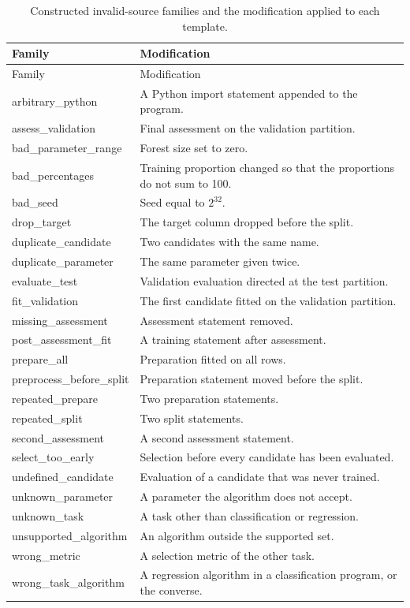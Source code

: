 \documentclass[11pt,letterpaper]{article}
\begin{document}
\begin{longtable}{p{}p{}}\caption{Constructed invalid-source families and the modification applied to each template.}\label{tab:sourcefamilies}\\\toprule Family & Modification\\\midrule\endfirsthead\toprule Family & Modification\\\midrule\endhead
arbitrary\_python & A Python import statement appended to the program.\\
assess\_validation & Final assessment on the validation partition.\\
bad\_parameter\_range & Forest size set to zero.\\
bad\_percentages & Training proportion changed so that the proportions do not sum to 100.\\
bad\_seed & Seed equal to $2^{32}$.\\
drop\_target & The target column dropped before the split.\\
duplicate\_candidate & Two candidates with the same name.\\
duplicate\_parameter & The same parameter given twice.\\
evaluate\_test & Validation evaluation directed at the test partition.\\
fit\_validation & The first candidate fitted on the validation partition.\\
missing\_assessment & Assessment statement removed.\\
post\_assessment\_fit & A training statement after assessment.\\
prepare\_all & Preparation fitted on all rows.\\
preprocess\_before\_split & Preparation statement moved before the split.\\
repeated\_prepare & Two preparation statements.\\
repeated\_split & Two split statements.\\
second\_assessment & A second assessment statement.\\
select\_too\_early & Selection before every candidate has been evaluated.\\
undefined\_candidate & Evaluation of a candidate that was never trained.\\
unknown\_parameter & A parameter the algorithm does not accept.\\
unknown\_task & A task other than classification or regression.\\
unsupported\_algorithm & An algorithm outside the supported set.\\
wrong\_metric & A selection metric of the other task.\\
wrong\_task\_algorithm & A regression algorithm in a classification program, or the converse.\\
\bottomrule\end{longtable}
\end{document}
